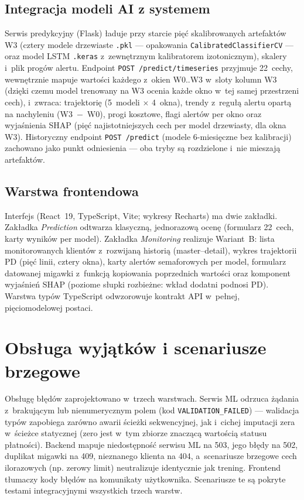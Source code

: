 \subsection{Integracja modeli AI z systemem}

Serwis predykcyjny (Flask) ładuje przy starcie pięć skalibrowanych artefaktów
W3 (cztery modele drzewiaste \texttt{.pkl} --- opakowania
\texttt{CalibratedClassifierCV} --- oraz model LSTM \texttt{.keras}
z~zewnętrznym kalibratorem izotonicznym), skalery i~plik progów alertu.
Endpoint \texttt{POST /predict/timeseries} przyjmuje 22~cechy, wewnętrznie
mapuje wartości każdego z~okien W0..W3 w~sloty kolumn W3 (dzięki czemu model
trenowany na W3 ocenia każde okno w~tej samej przestrzeni cech), i~zwraca:
trajektorię (5~modeli $\times$ 4~okna), trendy z~regułą alertu opartą na
nachyleniu (W3~$-$~W0), progi kosztowe, flagi alertów per okno oraz wyjaśnienia
SHAP (pięć najistotniejszych cech per model drzewiasty, dla okna W3).
Historyczny endpoint \texttt{POST /predict} (modele 6-miesięczne bez
kalibracji) zachowano jako punkt odniesienia --- oba tryby są rozdzielone
i~nie mieszają artefaktów.

\subsection{Warstwa frontendowa}

Interfejs (React~19, TypeScript, Vite; wykresy Recharts) ma dwie zakładki.
Zakładka \emph{Prediction} odtwarza klasyczną, jednorazową ocenę (formularz
22~cech, karty wyników per model). Zakładka \emph{Monitoring} realizuje
Wariant~B: lista monitorowanych klientów z~rozwijaną historią (master--detail),
wykres trajektorii PD (pięć linii, cztery okna), karty alertów semaforowych per
model, formularz datowanej migawki z~funkcją kopiowania poprzednich wartości
oraz komponent wyjaśnień SHAP (poziome słupki rozbieżne: wkład dodatni podnosi
PD). Warstwa typów TypeScript odwzorowuje kontrakt API w~pełnej,
pięciomodelowej postaci.

\section{Obsługa wyjątków i scenariusze brzegowe}

Obsługę błędów zaprojektowano w~trzech warstwach. Serwis ML odrzuca żądania
z~brakującym lub nienumerycznym polem (kod \texttt{VALIDATION\_FAILED}) ---
walidacja typów zapobiega zarówno awarii ścieżki sekwencyjnej, jak i~cichej
imputacji zera w~ścieżce statycznej (zero jest w~tym zbiorze znaczącą wartością
statusu płatności). Backend mapuje niedostępność serwisu ML na 503, jego błędy
na 502, duplikat migawki na 409, nieznanego klienta na 404, a~scenariusze
brzegowe cech ilorazowych (np. zerowy limit) neutralizuje identycznie jak
trening. Frontend tłumaczy kody błędów na komunikaty użytkownika. Scenariusze
te są pokryte testami integracyjnymi wszystkich trzech warstw.

